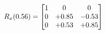 \documentclass[preview]{standalone}
\begin{document}
\begin{align*}
\special{dvisvgm:raw <g id='unique000'>}R_{x}(0.56) = \begin{bmatrix}1 & 0 & 0 \\0 & +0.85 & -0.53 \\0 & +0.53 & +0.85\end{bmatrix}\special{dvisvgm:raw </g>}
\end{align*}
\end{document}
